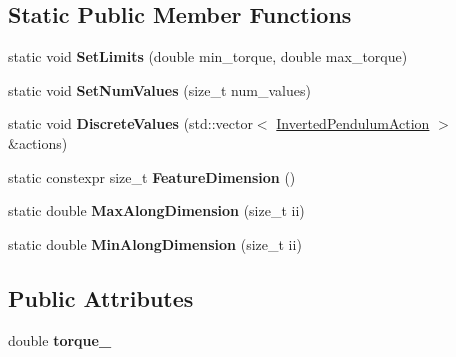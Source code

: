 \subsection*{Static Public Member Functions}
\begin{DoxyCompactItemize}
\item 
\hypertarget{structrl_1_1_inverted_pendulum_action_afab6800d178b15040d0ebbc31baf4c14}{}\label{structrl_1_1_inverted_pendulum_action_afab6800d178b15040d0ebbc31baf4c14} 
static void {\bfseries Set\+Limits} (double min\+\_\+torque, double max\+\_\+torque)
\item 
\hypertarget{structrl_1_1_inverted_pendulum_action_ae0ac0a859d0426c95dfb015cafcd09d0}{}\label{structrl_1_1_inverted_pendulum_action_ae0ac0a859d0426c95dfb015cafcd09d0} 
static void {\bfseries Set\+Num\+Values} (size\+\_\+t num\+\_\+values)
\item 
\hypertarget{structrl_1_1_inverted_pendulum_action_a1e2f849177051a16ed5de3da2abfe8b2}{}\label{structrl_1_1_inverted_pendulum_action_a1e2f849177051a16ed5de3da2abfe8b2} 
static void {\bfseries Discrete\+Values} (std\+::vector$<$ \hyperlink{structrl_1_1_inverted_pendulum_action}{Inverted\+Pendulum\+Action} $>$ \&actions)
\item 
\hypertarget{structrl_1_1_inverted_pendulum_action_aa180acad4dc081aed0a5639141f4cda6}{}\label{structrl_1_1_inverted_pendulum_action_aa180acad4dc081aed0a5639141f4cda6} 
static constexpr size\+\_\+t {\bfseries Feature\+Dimension} ()
\item 
\hypertarget{structrl_1_1_inverted_pendulum_action_ad83c2b6dbdcf0fe0e7e46df1b6a7668c}{}\label{structrl_1_1_inverted_pendulum_action_ad83c2b6dbdcf0fe0e7e46df1b6a7668c} 
static double {\bfseries Max\+Along\+Dimension} (size\+\_\+t ii)
\item 
\hypertarget{structrl_1_1_inverted_pendulum_action_aea38cad833905876cc5c56d653ca8dce}{}\label{structrl_1_1_inverted_pendulum_action_aea38cad833905876cc5c56d653ca8dce} 
static double {\bfseries Min\+Along\+Dimension} (size\+\_\+t ii)
\end{DoxyCompactItemize}
\subsection*{Public Attributes}
\begin{DoxyCompactItemize}
\item 
\hypertarget{structrl_1_1_inverted_pendulum_action_a06cb28fd3554985bfd6686e43749ba73}{}\label{structrl_1_1_inverted_pendulum_action_a06cb28fd3554985bfd6686e43749ba73} 
double {\bfseries torque\+\_\+}
\end{DoxyCompactItemize}
